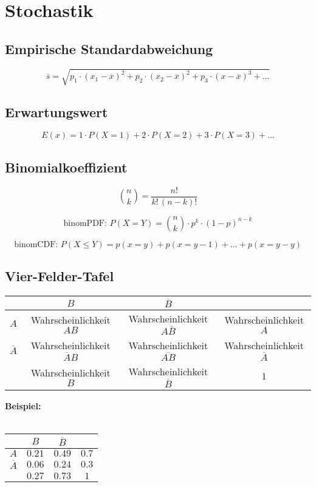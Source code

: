 \section{Stochastik}
	\subsection{Empirische Standardabweichung}
		$$ \overline{s} = \sqrt{p_{1} \cdot (x_{1}-\overline{x})^{2}+p_{2} \cdot (x_{2}-\overline{x})^{2}+p_{3} \cdot (x-\overline{x})^{3}+...} $$
	\subsection{Erwartungswert}
		$$ E(x) = 1 \cdot P(X = 1) + 2 \cdot P(X = 2) + 3 \cdot P(X = 3) + ... $$
	\subsection{Binomialkoeffizient}
$$
\binom{n}{k} =  \frac{n!}{k!\,(n-k)!}
$$

$$
\text{binomPDF: } P(X=Y) = \binom{n}{k} \cdot p^{k} \cdot (1-p)^{n-k}
$$

$$
\text{binomCDF: } P(X\leq Y) = p(x=y) + p(x=y-1) + ... + p(x=y-y)
$$
	\subsection{Vier-Felder-Tafel}
	\begin{center}
	\begin{tabular}{|c|c|c|c|}
	\hline 
	 & $B$ & $\overline{B}$ &  \\ 
	\hline
	$A$ & Wahrscheinlichkeit $AB$ & Wahrscheinlichkeit $A\overline{B}$ & Wahrscheinlichkeit $A$ \\ 
	\hline
	$\overline{A}$ & Wahrscheinlichkeit $\overline{A}B$ & Wahrscheinlichkeit $\overline{AB}$ & Wahrscheinlichkeit $\overline{A}$ \\ 
	\hline
	 & Wahrscheinlichkeit $B$ & Wahrscheinlichkeit $\overline{B}$ & $1$ \\ 
	\hline 
	\end{tabular} 
	\end{center}
	\textbf{Beispiel:} \\
	\\
	\begin{tabular}{|c|c|c|c|}
	\hline 
	 & $B$ & $\overline{B}$ &  \\ 
	\hline
	$A$ & $0.21$ & $0.49$ & $0.7$ \\ 
	\hline
	$\overline{A}$ & $0.06$ & $0.24$ & $0.3$ \\ 
	\hline
	 & $0.27$ & $0.73$ & $1$ \\ 
	\hline 
	\end{tabular}
